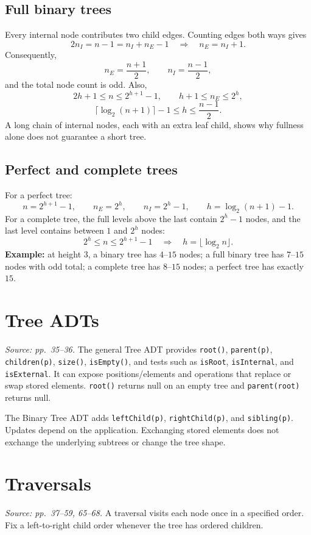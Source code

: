 \documentclass[11pt]{article}
\begin{document}
\subsection{Full binary trees}
Every internal node contributes two child edges. Counting edges both ways gives
\[
2n_I=n-1=n_I+n_E-1\quad\Longrightarrow\quad n_E=n_I+1.
\]
Consequently,
\[
n_E=\frac{n+1}{2},\qquad n_I=\frac{n-1}{2},
\]
and the total node count is odd. Also,
\[
2h+1\le n\le2^{h+1}-1,\qquad h+1\le n_E\le2^h,
\]
\[
\lceil\log_2(n+1)\rceil-1\le h\le\frac{n-1}{2}.
\]
A long chain of internal nodes, each with an extra leaf child, shows why fullness alone does not guarantee a short tree.

\subsection{Perfect and complete trees}
For a perfect tree:
\[
n=2^{h+1}-1,\qquad n_E=2^h,\qquad n_I=2^h-1,
\qquad h=\log_2(n+1)-1.
\]
For a complete tree, the full levels above the last contain $2^h-1$ nodes, and the last level contains between $1$ and $2^h$ nodes:
\[
2^h\le n\le2^{h+1}-1
\quad\Longrightarrow\quad h=\lfloor\log_2 n\rfloor.
\]
\textbf{Example:} at height $3$, a binary tree has $4$--$15$ nodes; a full binary tree has $7$--$15$ nodes with odd total; a complete tree has $8$--$15$ nodes; a perfect tree has exactly $15$.

\section{Tree ADTs}
\textit{Source: pp.\ 35--36.}
The general Tree ADT provides \texttt{root()}, \texttt{parent(p)}, \texttt{children(p)}, \texttt{size()}, \texttt{isEmpty()}, and tests such as \texttt{isRoot}, \texttt{isInternal}, and \texttt{isExternal}. It can expose positions/elements and operations that replace or swap stored elements. \texttt{root()} returns null on an empty tree and \texttt{parent(root)} returns null.

The Binary Tree ADT adds \texttt{leftChild(p)}, \texttt{rightChild(p)}, and \texttt{sibling(p)}. Updates depend on the application. Exchanging stored elements does not exchange the underlying subtrees or change the tree shape.

\section{Traversals}
\textit{Source: pp.\ 37--59, 65--68.}
A traversal visits each node once in a specified order. Fix a left-to-right child order whenever the tree has ordered children.
\end{document}
